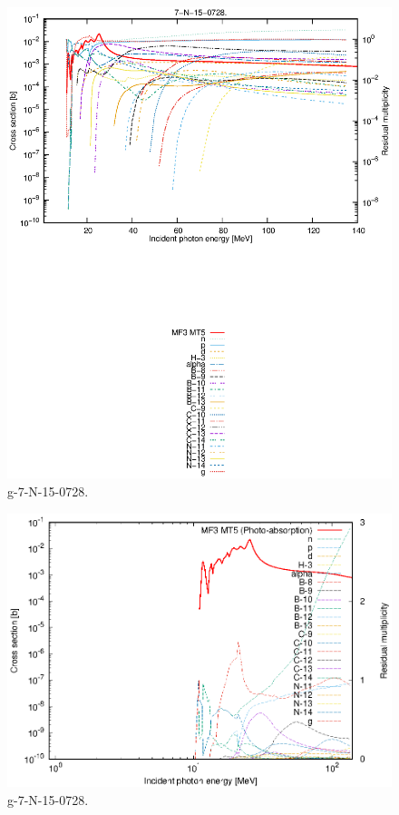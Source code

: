 \begin{figure}
 \includegraphics[width=\linewidth]{eps/g_7-N-15_0728.eps}
  \caption{g-7-N-15-0728.}
\end{figure}
\newpage \clearpage

\begin{figure}
 \includegraphics[width=\linewidth]{eps-log/g_7-N-15_0728.eps}
 \caption{g-7-N-15-0728.}
\end{figure}
\newpage \clearpage

